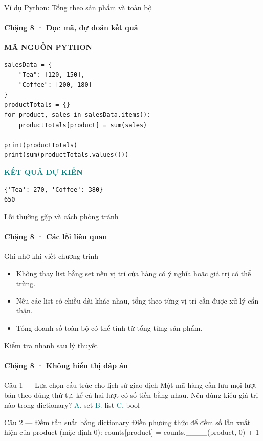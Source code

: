 \documentclass[aspectratio=169,10pt]{beamer}
\begin{document}
\begin{frame}[fragile,t]{Ví dụ Python: Tổng theo sản phẩm và toàn bộ}
\framesubtitle{Chặng 8 · Đọc mã, dự đoán kết quả}
\vspace{-1mm}
{\small\color{muted}\textbf{MÃ NGUỒN PYTHON}}\par\vspace{1mm}
\begin{Verbatim}[fontsize=\scriptsize,frame=single,framesep=4mm,rulecolor=\color{teal!35},breaklines=true]
salesData = {
    "Tea": [120, 150],
    "Coffee": [200, 180]
}
productTotals = {}
for product, sales in salesData.items():
    productTotals[product] = sum(sales)

print(productTotals)
print(sum(productTotals.values()))
\end{Verbatim}
\vspace{1mm}\textcolor{teal}{\scriptsize\textbf{KẾT QUẢ DỰ KIẾN}}
\begin{Verbatim}[fontsize=\scriptsize,breaklines=true]
{'Tea': 270, 'Coffee': 380}
650
\end{Verbatim}

\end{frame}

\begin{frame}[t]{Lỗi thường gặp và cách phòng tránh}
\framesubtitle{Chặng 8 · Các lỗi liên quan}
\begin{alertblock}{Ghi nhớ khi viết chương trình}
\begin{itemize}
\item Không thay list bằng set nếu vị trí cửa hàng có ý nghĩa hoặc giá trị có thể trùng.
\item Nếu các list có chiều dài khác nhau, tổng theo từng vị trí cần được xử lý cẩn thận.
\item Tổng doanh số toàn bộ có thể tính từ tổng từng sản phẩm.
\end{itemize}
\end{alertblock}

\end{frame}

\begin{frame}[t]{Kiểm tra nhanh sau lý thuyết}
\framesubtitle{Chặng 8 · Không hiển thị đáp án}
\small\begin{block}{Câu 1 — Lựa chọn cấu trúc cho lịch sử giao dịch}
Một mã hàng cần lưu mọi lượt bán theo đúng thứ tự, kể cả hai lượt có số tiền bằng nhau. Nên dùng kiểu giá trị nào trong dictionary?
\medskip
\quad \textcolor{teal}{A.} set\hspace{3mm}
\quad \textcolor{teal}{B.} list\hspace{3mm}
\quad \textcolor{teal}{C.} bool\hspace{3mm}
\end{block}
\begin{block}{Câu 2 — Đếm tần suất bằng dictionary}
Điền phương thức để đếm số lần xuất hiện của product (mặc định 0): counts[product] = counts.\_\_\_\_(product, 0) + 1
\end{block}
\end{frame}
\end{document}
